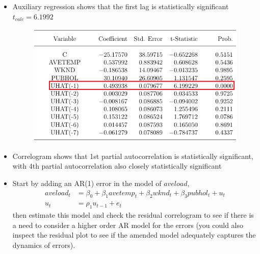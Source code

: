 \documentclass[12pt]{report}
\begin{document}
\begin{itemize}
	\item Auxiliary regression shows that the first lag is statistically significant $t_{calc} = 6.1992$
	\begin{figure}[H]
		\centerline{\includegraphics{tute10_16}}
	\end{figure}
	\vspace{-\baselineskip}
	
	\item Correlogram shows that 1st partial autocorrelation is statistically significant, with 4th partial autocorrelation also closely statistically significant
	\item Start by adding an AR(1) error in the model of $aveload$, \begin{align*}
	aveload_t &= \beta_0 + \beta_1 avetemp_t + \beta_2wknd_t + \beta_3pubhol_t + u_t \\
	u_t &= \rho_1u_{t-1} + e_t
	\end{align*} then estimate this model and check the residual correlogram to see if there is a need to consider a higher order AR model for the errors (you could also inspect the residual plot to see if the amended model adequately captures the dynamics of errors).
\end{itemize} 
\end{document}
